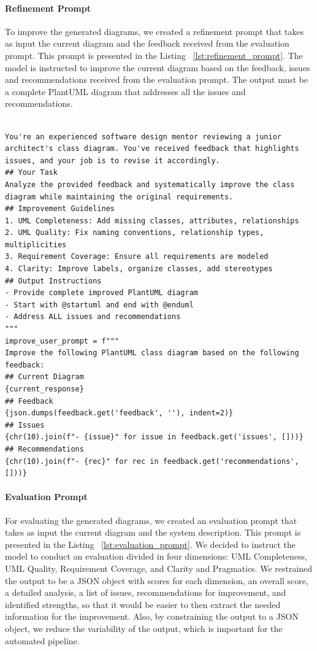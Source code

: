 \paragraph{Refinement Prompt}
To improve the generated diagrams, we created a refinement prompt that takes as input the current diagram and the feedback received from the evaluation prompt. This prompt is presented in the Listing ~\ref{lst:refinement_prompt}. The model is instructed to improve the current diagram based on the feedback, issues and recommendations received from the evaluation prompt. The output must be a complete PlantUML diagram that addresses all the issues and recommendations.

\begin{lstlisting}[caption={Improvement Prompt},label={lst:improvement_prompt}, basicstyle=\ttfamily\tiny]

You're an experienced software design mentor reviewing a junior architect's class diagram. You've received feedback that highlights issues, and your job is to revise it accordingly.
## Your Task
Analyze the provided feedback and systematically improve the class diagram while maintaining the original requirements.
## Improvement Guidelines
1. UML Completeness: Add missing classes, attributes, relationships
2. UML Quality: Fix naming conventions, relationship types, multiplicities
3. Requirement Coverage: Ensure all requirements are modeled
4. Clarity: Improve labels, organize classes, add stereotypes
## Output Instructions
- Provide complete improved PlantUML diagram
- Start with @startuml and end with @enduml
- Address ALL issues and recommendations
"""
improve_user_prompt = f"""
Improve the following PlantUML class diagram based on the following feedback:
## Current Diagram
{current_response}
## Feedback
{json.dumps(feedback.get('feedback', ''), indent=2)}
## Issues
{chr(10).join(f"- {issue}" for issue in feedback.get('issues', []))}
## Recommendations
{chr(10).join(f"- {rec}" for rec in feedback.get('recommendations', []))}
\end{lstlisting}

\paragraph{Evaluation Prompt}
For evaluating the generated diagrams, we created an evaluation prompt that takes as input the current diagram and the system description. This prompt is presented in the Listing ~\ref{lst:evaluation_prompt}. 
We decided to instruct the model to conduct an evaluation divided in four dimensions: UML Completeness, UML Quality, Requirement Coverage, and Clarity and Pragmatics. 
We restrained the output to be a JSON object with scores for each dimension, an overall score, a detailed analysis, a list of issues, recommendations for improvement, and identified strengths, so that it would be easier to then extract the needed information for the improvement. Also, by constraining the output to a JSON object, we reduce the variability of the output, which is important for the automated pipeline.

